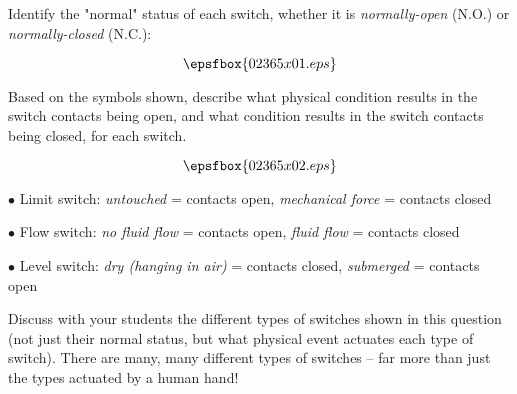 

Identify the "normal" status of each switch, whether it is {\it normally-open} (N.O.) or {\it normally-closed} (N.C.):

$$\epsfbox{02365x01.eps}$$

Based on the symbols shown, describe what physical condition results in the switch contacts being open, and what condition results in the switch contacts being closed, for each switch.







$$\epsfbox{02365x02.eps}$$

\medskip
\item{$\bullet$} Limit switch: {\it untouched} = contacts open, {\it mechanical force} = contacts closed
\item{$\bullet$} Flow switch: {\it no fluid flow} = contacts open, {\it fluid flow} = contacts closed
\item{$\bullet$} Level switch: {\it dry (hanging in air)} = contacts closed, {\it submerged} = contacts open
\medskip







Discuss with your students the different types of switches shown in this question (not just their normal status, but what physical event actuates each type of switch).  There are many, many different types of switches -- far more than just the types actuated by a human hand!




